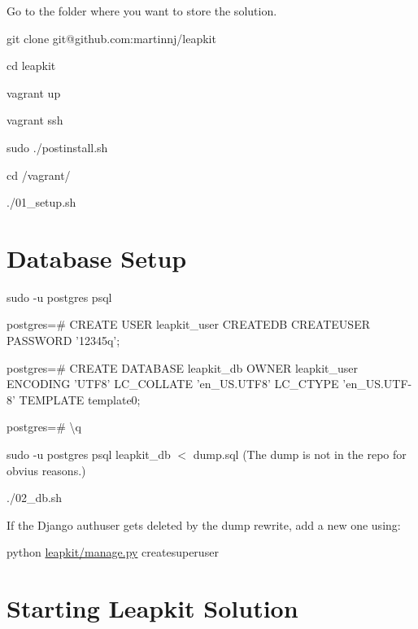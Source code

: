 
\begin{DoxyItemize}
\item Go to the folder where you want to store the solution.
\item {\ttfamily git clone git@github.\-com\-:martinnj/leapkit}
\item {\ttfamily cd leapkit}
\item {\ttfamily vagrant up}
\item {\ttfamily vagrant ssh}
\item {\ttfamily sudo ./postinstall.sh}
\item {\ttfamily cd /vagrant/}
\item {\ttfamily ./01\-\_\-setup.sh}
\end{DoxyItemize}

\section*{Database Setup }


\begin{DoxyItemize}
\item {\ttfamily sudo -\/u postgres psql}
\item {\ttfamily postgres=\# C\-R\-E\-A\-T\-E U\-S\-E\-R leapkit\-\_\-user C\-R\-E\-A\-T\-E\-D\-B C\-R\-E\-A\-T\-E\-U\-S\-E\-R P\-A\-S\-S\-W\-O\-R\-D '12345q';}
\item {\ttfamily postgres=\# C\-R\-E\-A\-T\-E D\-A\-T\-A\-B\-A\-S\-E leapkit\-\_\-db O\-W\-N\-E\-R leapkit\-\_\-user E\-N\-C\-O\-D\-I\-N\-G 'U\-T\-F8' L\-C\-\_\-\-C\-O\-L\-L\-A\-T\-E 'en\-\_\-\-U\-S.\-U\-T\-F8' L\-C\-\_\-\-C\-T\-Y\-P\-E 'en\-\_\-\-U\-S.\-U\-T\-F-\/8' T\-E\-M\-P\-L\-A\-T\-E template0;}
\item {\ttfamily postgres=\# \textbackslash{}q}
\item {\ttfamily sudo -\/u postgres psql leapkit\-\_\-db $<$ dump.\-sql} (The dump is not in the repo for obvius reasons.)
\item {\ttfamily ./02\-\_\-db.sh}
\item If the Django authuser gets deleted by the dump rewrite, add a new one using\-:
\item {\ttfamily python \hyperlink{manage_8py}{leapkit/manage.\-py} createsuperuser}
\end{DoxyItemize}

\section*{Starting Leapkit Solution }



